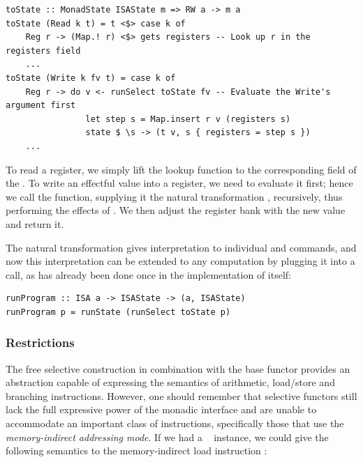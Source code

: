 \vspace{1mm}
\begin{verbatim}
toState :: MonadState ISAState m => RW a -> m a
toState (Read k t) = t <$> case k of
    Reg r -> (Map.! r) <$> gets registers -- Look up r in the registers field
    ...
toState (Write k fv t) = case k of
    Reg r -> do v <- runSelect toState fv -- Evaluate the Write's argument first
                let step s = Map.insert r v (registers s)
                state $ \s -> (t v, s { registers = step s })
    ...
\end{verbatim}
\vspace{1mm}

\noindent
To read a register, we simply lift the lookup function  to the
corresponding field of the . To write an effectful value 
into a register, we need to evaluate it first; hence we call the 
function, supplying it the natural transformation , recursively,
thus performing the effects of . We then adjust the register bank with
the new value and return it.

The natural transformation  gives interpretation to individual
 and  commands, and now this interpretation can be extended
to any  computation by plugging it into a  call, as has
already been done once in the implementation of  itself:

\vspace{1mm}
\begin{verbatim}
runProgram :: ISA a -> ISAState -> (a, ISAState)
runProgram p = runState (runSelect toState p)
\end{verbatim}

\subsubsection{Restrictions}

The free selective construction in combination with the base functor 
provides an abstraction capable of expressing the semantics of arithmetic,
load/store and branching instructions. However, one should remember that
selective functors still lack the full expressive power of the monadic interface
and are unable to accommodate an important class of instructions, specifically
those that use the \emph{memory-indirect addressing mode}. If we had a
~ instance, we could give the following semantics to the
memory-indirect load instruction :

